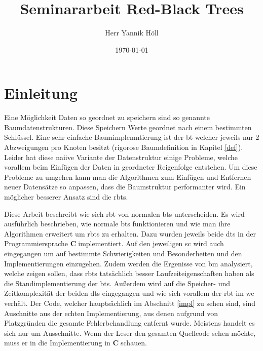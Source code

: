 \documentclass[11pt]{article}
\title{\textbf{Seminararbeit Red-Black Trees}}
\author{Herr Yannik Höll}
\date{\today}
\newcommand{\cpl}{\textbf{C}$\;$}
\begin{document}
\begin{titlingpage}
    \maketitle
\end{titlingpage}
\pagebreak

\tableofcontents
\pagebreak

\listoffigures
\pagebreak

\glsaddall
\printglossary
\pagebreak

\section{Einleitung}


Eine Möglichkeit Daten so geordnet zu speichern sind so genannte Baumdatenstrukturen. Diese Speichern Werte geordnet nach einem bestimmten Schlüssel.
Eine sehr einfache Baumimplemntierung ist der \gls{bt} welcher jeweils nur 2 Abzweigungen pro Knoten besitzt (rigorose Baumdefinition in Kapitel \ref{def}).
Leider hat diese naiive Variante der Datenstruktur einige Probleme, welche vorallem beim Einfügen der Daten in geordneter Reigenfolge entstehen.
Um diese Probleme zu umgehen kann man die Algorithmen zum Einfügen und Entfernen neuer Datensätze so anpassen, dass die Baumstruktur performanter wird.
Ein möglicher besserer Ansatz sind die \glspl{rbt}.

Diese Arbeit beschreibt wie sich \gls{rbt} von normalen \glspl{bt} unterscheiden. Es wird ausführlich beschrieben, wie normale \glspl{bt} funktionieren und wie man
ihre Algorithmen erweitert um \glspl{rbt} zu erhalten.
Dazu wurden jeweils beide \glspl{dt} in der Programmiersprache \cpl implementiert. Auf den jeweiligen \gls{sc} wird auch eingegangen um auf bestimmte Schwierigkeiten und Besonderheiten und den Implementierungen einzugehen.
Zudem werden die Ergenisse von \gls{bm} analysiert, welche zeigen sollen, dass \glspl{rbt} tatsächlich besser Laufzeiteigenschaften haben als
die Standimplementierung der \glspl{bt}.
Außerdem wird auf die Speicher- und Zeitkomplexität der beiden \glspl{dt} eingegangen und wie sich vorallem der \gls{rbt} im \gls{wc} verhält.
Der Code, welcher hauptsächlich im Abschnitt \ref{impl} zu sehen sind, sind Auschnitte aus der echten Implementierung, 
aus denen aufgrund von Platzgründen die gesamte Fehlerbehandlung entfernt wurde. Meistens handelt es sich nur um Ausschnitte. 
Wenn der Leser den gesamten Quellcode sehen möchte, muss er in die Implementierung in \cpl schauen. 
\end{document}
